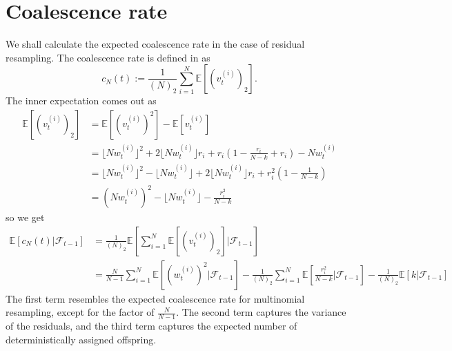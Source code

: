 \documentclass[fleqn]{article}
\newcommand{\E}{\mathbb{E}}
\newcommand{\F}{\mathcal{F}_{t-1}}
\newcommand{\vt}[2][t]{v_{#1}^{(#2)}}
\newcommand{\wt}[2][t]{w_{#1}^{(#2)}}
\begin{document}
\section{Coalescence rate}
We shall calculate the expected coalescence rate in the case of residual resampling. The coalescence rate is defined in \citet{koskela2018} as
\begin{equation*}
c_N(t) := \frac{1}{(N)_2} \sum_{i=1}^{N} \E\left[ (\vt{i})_2 \right].
\end{equation*}
The inner expectation comes out as
\begin{align*}
\E[(\vt{i})_2] &= \E[(\vt{i})^2] - \E[\vt{i}] \\
&= \lfloor N\wt{i} \rfloor^2 + 2\lfloor N\wt{i} \rfloor r_i + r_i \left(1 - \frac{r_i}{N-k} + r_i \right) - N\wt{i} \\
&= \lfloor N\wt{i} \rfloor^2 - \lfloor N\wt{i} \rfloor + 2\lfloor N\wt{i} \rfloor r_i + r_i^2 \left(1- \frac{1}{N-k} \right) \\
&= (N\wt{i})^2 - \lfloor N\wt{i} \rfloor - \frac{r_i^2}{N-k}
\end{align*}
so we get
\begin{align*}
\E[c_N(t) |\F] &=  \frac{1}{(N)_2} \E\left[ \sum_{i=1}^{N} \E[(\vt{i})_2] |\F \right] \\
&= \frac{N}{N-1} \sum_{i=1}^{N} \E[(\wt{i})^2 |\F] - \frac{1}{(N)_2} \sum_{i=1}^{N} \E\left[ \frac{r_i^2}{N-k} |\F \right] - \frac{1}{(N)_2} \E[k |\F]
\end{align*}
The first term resembles the expected coalescence rate for multinomial resampling, except for the factor of $\frac{N}{N-1}$. The second term captures the variance of the residuals, and the third term captures the expected number of deterministically assigned offspring.


\end{document}
